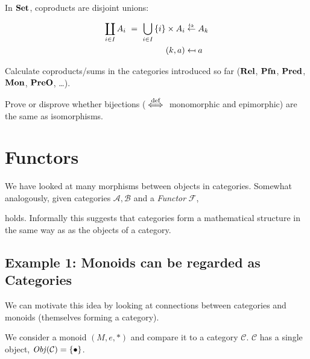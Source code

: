 In $\mathbf {Set}$, coproducts are disjoint unions:

\begin{equation*}
    \begin{aligned}
        \coprod_{i \in I} A_i \ = \ \bigcup_{i \in I}\, \setof{i} \times A_i &
        \overset{\iota_k}{\leftarrow} A_k
        \\
        (k, a) &
        \mapsfrom a
    \end{aligned}
\end{equation*}

\begin{exercise}
Calculate coproducts/sums in the categories introduced so far ($\mathbf {Rel}$,
$\mathbf {Pfn}$, $\mathbf {Pred}$, $\mathbf {Mon}$, $\mathbf {PreO}$, \dots).
\end{exercise}

\begin{exercise}
Prove or disprove whether bijections ($\stackrel{\text{def}}{\iff}$ monomorphic and epimorphic) are
the same as isomorphisms.
\end{exercise}

\section{Functors}

We have looked at many morphisms between objects in categories. Somewhat
analogously, given categories $\mathcal{A, B}$ and a
\textit{Functor} $\mathcal{F}$,

\begin{center}
\end{center}

holds. Informally this suggests that categories form a mathematical
structure in the same way as as the objects of a category.

\subsection{Example 1: Monoids can be regarded as Categories}

We can motivate this idea by looking at connections between categories and
monoids (themselves forming a category).

We consider a monoid $(M, e, \ast)$ and compare it to a category $\mathcal C$.
$\mathcal C$ has a single object, $\operatorname{\mathit{Obj}}(\mathcal C) = \{ \bullet \}$.

